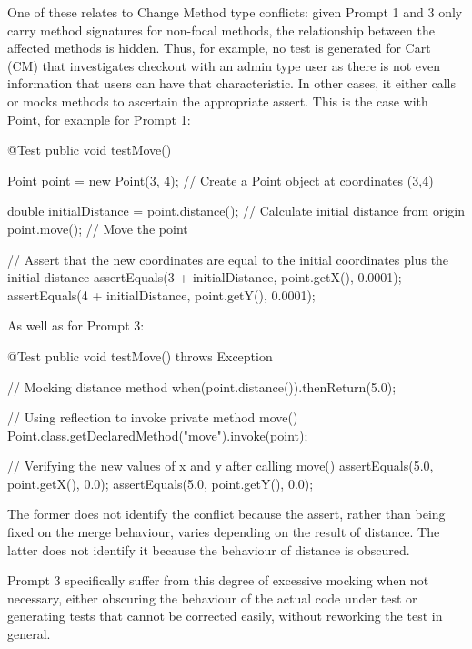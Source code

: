 One of these relates to Change Method type conflicts: given Prompt 1 and 3 only carry method signatures for non-focal methods,
the relationship between the affected methods is hidden. Thus, for example, no test is generated for Cart (CM) that investigates
checkout with an admin type user as there is not even information that users can have that characteristic. In other cases, it either
calls or mocks methods to ascertain the appropriate assert. This is the case with Point, for example for Prompt 1:
\begin{answer}
    @Test
    public void testMove() {
        Point point = new Point(3, 4); // Create a Point object at coordinates (3,4)
        
        double initialDistance = point.distance(); // Calculate initial distance from origin
        point.move(); // Move the point
        
        // Assert that the new coordinates are equal to the initial coordinates plus the initial distance
        assertEquals(3 + initialDistance, point.getX(), 0.0001); 
        assertEquals(4 + initialDistance, point.getY(), 0.0001);
    }
\end{answer}
As well as for Prompt 3:
\begin{answer}
    @Test
    public void testMove() throws Exception {
        // Mocking distance method
        when(point.distance()).thenReturn(5.0);

        // Using reflection to invoke private method move()
        Point.class.getDeclaredMethod("move").invoke(point);

        // Verifying the new values of x and y after calling move()
        assertEquals(5.0, point.getX(), 0.0);
        assertEquals(5.0, point.getY(), 0.0);
    }
\end{answer}
The former does not identify the conflict because the assert, rather than being fixed on the merge behaviour,
varies depending on the result of distance. The latter does not identify it because the behaviour of distance is 
obscured.

Prompt 3 specifically suffer from this degree of excessive mocking when not necessary, either obscuring the behaviour of 
the actual code under test or generating tests that cannot be corrected easily, without reworking the test in general.

